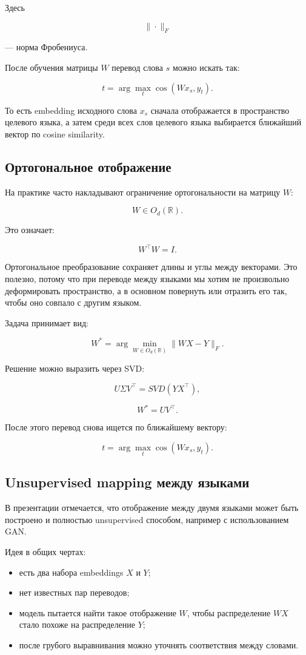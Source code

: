 \documentclass[a4paper,12pt]{article}
\begin{document}
Здесь

\[
\|\cdot\|_F
\]

--- норма Фробениуса.

После обучения матрицы \(W\) перевод слова \(s\) можно искать так:

\[
t
=
\arg\max_t
\cos(Wx_s, y_t).
\]

То есть embedding исходного слова \(x_s\) сначала отображается в пространство целевого языка, а затем среди всех слов целевого языка выбирается ближайший вектор по cosine similarity.

\subsection{Ортогональное отображение}

На практике часто накладывают ограничение ортогональности на матрицу \(W\):

\[
W \in O_d(\mathbb{R}).
\]

Это означает:

\[
W^\top W = I.
\]

Ортогональное преобразование сохраняет длины и углы между векторами. Это полезно, потому что при переводе между языками мы хотим не произвольно деформировать пространство, а в основном повернуть или отразить его так, чтобы оно совпало с другим языком.

Задача принимает вид:

\[
W^*
=
\arg\min_{W \in O_d(\mathbb{R})}
\|WX - Y\|_F.
\]

Решение можно выразить через SVD:

\[
U \Sigma V^\top = SVD(YX^\top),
\]

\[
W^* = UV^\top.
\]

После этого перевод снова ищется по ближайшему вектору:

\[
t
=
\arg\max_t
\cos(Wx_s, y_t).
\]


\subsection{Unsupervised mapping между языками}

В презентации отмечается, что отображение между двумя языками может быть построено и полностью unsupervised способом, например с использованием GAN.

Идея в общих чертах:

\begin{itemize}
    \item есть два набора embeddings \(X\) и \(Y\);
    \item нет известных пар переводов;
    \item модель пытается найти такое отображение \(W\), чтобы распределение \(WX\) стало похоже на распределение \(Y\);
    \item после грубого выравнивания можно уточнять соответствия между словами.
\end{itemize}
\end{document}
